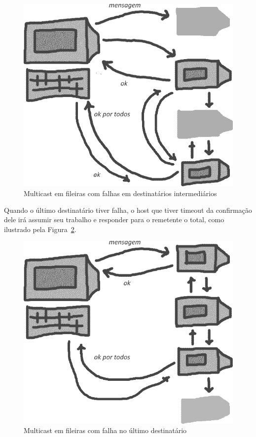 \documentclass[12pt,twocolumn]{article}
\begin{document}
					\begin{figure}[t]	%
						\centering
						\includegraphics[width=0.9\linewidth]{multicast_encadeado_falha.png}%
						\caption{Multicast em fileiras com falhas em destinatários intermediários}%
						\label{fig:multicast_fileira_falha}				
					\end{figure}
				
					Quando o último destinatário tiver falha, o host que tiver timeout da confirmação dele irá assumir seu trabalho e responder para o remetente o total, como ilustrado pela Figura~\ref{fig:multicast_fileira_falha_final}. 
				
					\begin{figure}[t]	%
						\centering
						\includegraphics[width=0.9\linewidth]{multicast_encadeado_falha_final.png}%
						\caption{Multicast em fileiras com falha no último destinatário}%
						\label{fig:multicast_fileira_falha_final}				
					\end{figure}
					
\end{document}
